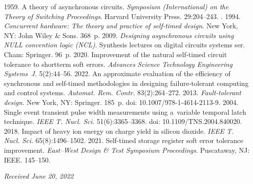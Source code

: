 \begin{multicols}{2}
{{\begin{thebibliography}{99}
 1959. A theory of asynchronous circuits. \textit{Symposium 
(International) on the Theory of Switching Proceedings}. Harvard University Press. 29:204--243.
. 1994. \textit{Concurrent 
hardware: The theory and practice of self-timed design}. New York, NY: John Wiley \& Sons. 368~p.
 2009. \textit{Designing asynchronous circuits using NULL convention logic 
(NCL)}. Synthesis lectures on digital circuits systems ser. Cham: Springer. 96~p.
 2020. Improvement of the natural self-timed circuit tolerance to shortterm soft errors. 
\textit{Advances Science Technology Engineering Systems~J.} 5(2):44--56.
 2022. 
An approximate evaluation of the efficiency of synchronous and self-timed methodologies in designing 
failure-tolerant computing and control systems. \textit{Automat. Rem. Contr.} 83(2):264--272.
 2013. \textit{Fault-tolerant design}. New York, NY: Springer. 185~p.
doi: 10.1007/978-1-4614-2113-9.
 2004. 
Single event transient pulse width measurements using a~variable temporal latch technique. \textit{IEEE 
T. Nucl. Sci.} 51(6):3365--3368. doi: 10.1109/TNS.2004.840020.
 2018. Impact of heavy ion energy on 
charge yield in silicon dioxide. \textit{IEEE T. Nucl. Sci.} 65(8):1496--1502.
 2021. 
Self-timed storage register soft error tolerance improvement. \textit{East--West Design \& Test 
Symposium Proceedings}. Puscataway, NJ: IEEE. 145--150.
\end{thebibliography}

 }
 }

\end{multicols}

\vspace*{-6pt}

\hfill{\small\textit{Received June 20, 2022}}

\Contr

